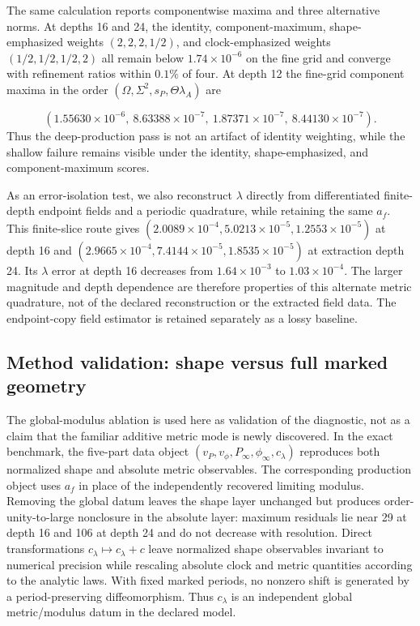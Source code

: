 \documentclass{iopjournal}
\begin{document}
The same calculation reports componentwise maxima and three alternative norms. At depths 16 and 24, the identity, component-maximum, shape-emphasized weights $(2,2,2,1/2)$, and clock-emphasized weights $(1/2,1/2,1/2,2)$ all remain below $1.74\times10^{-6}$ on the fine grid and converge with refinement ratios within $0.1\%$ of four. At depth 12 the fine-grid component maxima in the order $(\Omega,\Sigma^2,s_P,\Theta\lambda_A)$ are

\[
(1.55630\times10^{-6},\ 8.63388\times10^{-7},\
1.87371\times10^{-7},\ 8.44130\times10^{-7}).
\]
Thus the deep-production pass is not an artifact of identity weighting, while the shallow failure remains visible under the identity, shape-emphasized, and component-maximum scores.

As an error-isolation test, we also reconstruct $\lambda$ directly from differentiated finite-depth endpoint fields and a periodic quadrature, while retaining the same $a_f$. This finite-slice route gives $(2.0089\times10^{-4},5.0213\times10^{-5},1.2553\times10^{-5})$ at depth 16 and $(2.9665\times10^{-4},7.4144\times10^{-5},1.8535\times10^{-5})$ at extraction depth 24. Its $\lambda$ error at depth 16 decreases from $1.64\times10^{-3}$ to $1.03\times10^{-4}$. The larger magnitude and depth dependence are therefore properties of this alternate metric quadrature, not of the declared reconstruction or the extracted field data. The endpoint-copy field estimator is retained separately as a lossy baseline.

\subsection{Method validation: shape versus full marked geometry}
The global-modulus ablation is used here as validation of the diagnostic, not as a claim that the familiar additive metric mode is newly discovered. In the exact benchmark, the five-part data object $(v_P,v_\phi,P_\infty,\phi_\infty,c_\lambda)$ reproduces both normalized shape and absolute metric observables. The corresponding production object uses $a_f$ in place of the independently recovered limiting modulus. Removing the global datum leaves the shape layer unchanged but produces order-unity-to-large nonclosure in the absolute layer: maximum residuals lie near 29 at depth 16 and 106 at depth 24 and do not decrease with resolution. Direct transformations $c_\lambda\mapsto c_\lambda+c$ leave normalized shape observables invariant to numerical precision while rescaling absolute clock and metric quantities according to the analytic laws. With fixed marked periods, no nonzero shift is generated by a period-preserving diffeomorphism. Thus $c_\lambda$ is an independent global metric/modulus datum in the declared model.
\end{document}

